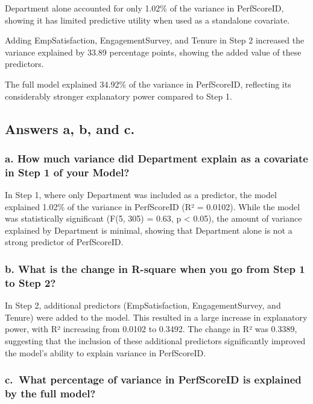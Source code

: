 \documentclass[
]{article}
\begin{document}
Department alone accounted for only 1.02\% of the variance in
PerfScoreID, showing it has limited predictive utility when used as a
standalone covariate.

Adding EmpSatisfaction, EngagementSurvey, and Tenure in Step 2 increased
the variance explained by 33.89 percentage points, showing the added
value of these predictors.

The full model explained 34.92\% of the variance in PerfScoreID,
reflecting its considerably stronger explanatory power compared to Step
1.

\subsection{Answers a, b, and c.}\label{answers-a-b-and-c.-1}

\subsubsection{a. How much variance did Department explain as a
covariate in Step 1 of your
Model?}\label{a.-how-much-variance-did-department-explain-as-a-covariate-in-step-1-of-your-model}

In Step 1, where only Department was included as a predictor, the model
explained 1.02\% of the variance in PerfScoreID (R² = 0.0102). While the
model was statistically significant (F(5, 305) = 0.63, p \textless{}
0.05), the amount of variance explained by Department is minimal,
showing that Department alone is not a strong predictor of PerfScoreID.

\subsubsection{b. What is the change in R-square when you go from Step 1
to Step
2?}\label{b.-what-is-the-change-in-r-square-when-you-go-from-step-1-to-step-2}

In Step 2, additional predictors (EmpSatisfaction, EngagementSurvey, and
Tenure) were added to the model. This resulted in a large increase in
explanatory power, with R² increasing from 0.0102 to 0.3492. The change
in R² was 0.3389, suggesting that the inclusion of these additional
predictors significantly improved the model's ability to explain
variance in PerfScoreID.

\subsubsection{c.~What percentage of variance in PerfScoreID is
explained by the full
model?}\label{c.-what-percentage-of-variance-in-perfscoreid-is-explained-by-the-full-model}
\end{document}
